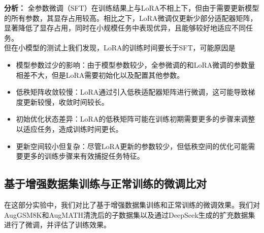 \documentclass{article}
\begin{document}
\textbf{分析：}
全参数微调（SFT）在训练结果上与LoRA不相上下，但由于需要更新模型的所有参数，其显存占用较高。相比之下，LoRA微调仅更新少部分适配器矩阵，显著降低了显存占用，同时在小规模任务中表现优异，且能够较好地适应不同任务。\\
但在小模型的测试上我们发现，LoRA的训练时间要长于SFT，可能原因是
\begin{itemize}
  \item 模型参数过少的影响：由于模型参数较少，全参微调的和LoRA微调的参数量相差不大，但是LoRA需要初始化以及配置其他参数。
  \item 低秩矩阵收敛较慢：LoRA通过引入低秩适配器矩阵进行微调，这可能导致梯度更新较慢，收敛时间较长。
  \item 初始优化状态差异：LoRA的低秩矩阵可能在训练初期需要更多的步骤来调整以适应任务，造成训练时间更长。
  \item 更新空间较小但复杂：尽管LoRA更新的参数较少，但低秩空间的优化可能需要更多的训练步骤来有效捕捉任务特征。
  
\end{itemize}


\subsection{基于增强数据集训练与正常训练的微调比对}
在这部分实验中，我们对比了基于增强数据集训练和正常训练的微调效果。我们对AugGSM8K和AugMATH清洗后的子数据集以及通过DeepSeek生成的扩充数据集进行了微调，并评估了训练效果。
\end{document}
